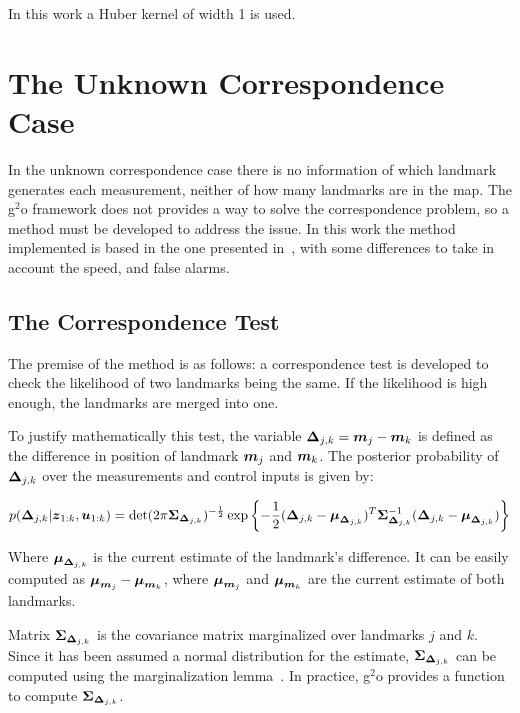 In this work a Huber kernel of width 1 is used.

\section{The Unknown Correspondence Case}

In the unknown correspondence case there is no information of which landmark generates each measurement, neither of how many landmarks are in the map. The g$^2$o framework does not provides a way to solve the correspondence problem, so a method must be developed to address the issue. In this work the method implemented is based in the one presented in~\cite{graphslam}, with some differences to take in account the speed, and false alarms. 

\subsection{The Correspondence Test}

The premise of the method is as follows: a correspondence test is developed to check the likelihood of two landmarks being the same. If the likelihood is high enough, the landmarks are merged into one. 

To justify mathematically this test, the variable $\boldsymbol{\Delta}_{j,k}=\boldsymbol{m}_j-\boldsymbol{m}_k$ is defined as the difference in position of landmark $\boldsymbol{m}_j$ and $\boldsymbol{m}_k$. The posterior probability of $\boldsymbol{\Delta}_{j,k}$ over the measurements and control inputs is given by:

\begin{equation}
p(\boldsymbol{\Delta}_{j,k}|\boldsymbol{z}_{1:k},\boldsymbol{u}_{1:k})=
\det(2\pi \boldsymbol{\Sigma}_{\boldsymbol{\Delta}_{j,k}})^{-\frac{1}{2}}\exp\left\lbrace -\frac{1}{2}(\boldsymbol{\Delta}_{j,k}-\boldsymbol{\mu}_{\boldsymbol{\Delta}_{j,k}})^T
\boldsymbol{\Sigma}_{\boldsymbol{\Delta}_{j,k}}^{-1}(\boldsymbol{\Delta}_{j,k}-\boldsymbol{\mu}_{\boldsymbol{\Delta}_{j,k}})\right\rbrace
\label{eq:correspondence-test}
\end{equation}

Where $\boldsymbol{\mu}_{\boldsymbol{\Delta}_{j,k}}$ is the current estimate of the landmark's difference. It can be easily computed as $\boldsymbol{\mu}_{\boldsymbol{m}_j}-\boldsymbol{\mu}_{\boldsymbol{m}_k}$, where $\boldsymbol{\mu}_{\boldsymbol{m}_j}$ and $\boldsymbol{\mu}_{\boldsymbol{m}_k}$ are the current estimate of both landmarks.

Matrix $\boldsymbol{\Sigma}_{\boldsymbol{\Delta}_{j,k}}$ is the covariance matrix marginalized over landmarks $j$ and $k$. Since it has been assumed a normal distribution for the estimate, $\boldsymbol{\Sigma}_{\boldsymbol{\Delta}_{j,k}}$ can be computed using the marginalization lemma~\cite{graphslam}. In practice, g$^2$o provides a function to compute $\boldsymbol{\Sigma}_{\boldsymbol{\Delta}_{j,k}}$.

